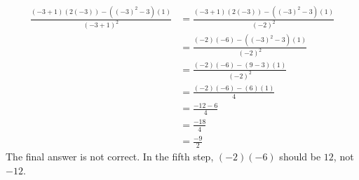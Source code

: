 {\begin{equation*}
	\begin{split}
		\frac{(-3+1)(2(-3))-((-3)^2-3)(1)}{(-3+1)^2} & = \frac{(-3+1)(2(-3)) - ((-3)^2-3)(1)}{(-2)^2} \\
							     & = \frac{(-2)(-6)-((-3)^2-3)(1)}{(-2)^2} \\
							     & = \frac{(-2)(-6) -(9-3)(1)}{(-2)^2} \\
							     & = \frac{(-2)(-6) -(6)(1)}{4} \\
							     & = \frac{-12-6}{4} \\
							     & = \frac{-18}{4} \\
							     & = \frac{-9}{2}
	\end{split}
\end{equation*} }
{The final answer is not correct. In the fifth step, $(-2)(-6)$ should be $12$, not $-12$.}
